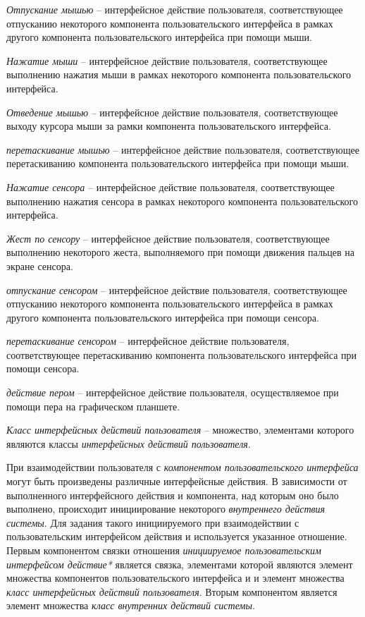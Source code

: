 \textit{Отпускание мышью} -- интерфейсное действие пользователя, соответствующее отпусканию некоторого компонента пользовательского интерфейса в рамках другого компонента пользовательского интерфейса при помощи мыши.

\textit{Нажатие мыши} -- интерфейсное действие пользователя, соответствующее выполнению нажатия мыши в рамках некоторого компонента пользовательского интерфейса.

\textit{Отведение мышью} -- интерфейсное действие пользователя, соответствующее выходу курсора мыши за рамки компонента пользовательского интерфейса.

\textit{перетаскивание мышью} -- интерфейсное действие пользователя, соответствующее перетаскиванию компонента пользовательского интерфейса при помощи мыши.

\textit{Нажатие сенсора} -- интерфейсное действие пользователя, соответствующее выполнению нажатия сенсора в рамках некоторого компонента пользовательского интерфейса.

\textit{Жест по сенсору} -- интерфейсное действие пользователя, соответствующее выполнению некоторого жеста, выполняемого при помощи движения пальцев на экране сенсора.

\textit{отпускание сенсором} -- интерфейсное действие пользователя, соответствующее отпусканию некоторого компонента пользовательского интерфейса в рамках другого компонента пользовательского интерфейса при помощи сенсора.

\textit{перетаскивание сенсором} -- интерфейсное действие пользователя, соответствующее перетаскиванию компонента пользовательского интерфейса при помощи сенсора.

\textit{действие пером} -- интерфейсное действие пользователя, осуществляемое при помощи пера на графическом планшете.

\textit{Класс интерфейсных действий пользователя} -- множество, элементами которого являются классы \textit{интерфейсных действий пользователя}.

При взаимодействии пользователя с \textit{компонентом пользовательского интерфейса} могут быть произведены различные интерфейсные действия. В зависимости от выполненного интерфейсного действия и компонента, над которым оно было выполнено, происходит инициирование некоторого \textit{внутреннего действия системы}. Для задания такого инициируемого при взаимодействии с пользовательским интерфейсом действия и используется указанное отношение. Первым компонентом связки отношения \textit{инициируемое пользовательским интерфейсом действие*} является связка, элементами которой являются элемент множества компонентов пользовательского интерфейса и и элемент множества \textit{класс интерфейсных действий пользователя}. Вторым компонентом является элемент множества \textit{класс внутренних действий системы}.

